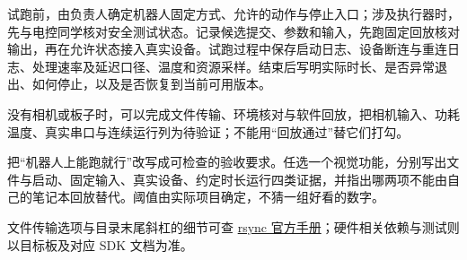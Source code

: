\begin{example}[给一次板端试跑写清证据]
试跑前，由负责人确定机器人固定方式、允许的动作与停止入口；涉及执行器时，先与电控同学核对安全测试状态。记录候选提交、参数和输入，先跑固定回放核对输出，再在允许状态接入真实设备。试跑过程中保存启动日志、设备断连与重连日志、处理速率及延迟口径、温度和资源采样。结束后写明实际时长、是否异常退出、如何停止，以及是否恢复到当前可用版本。

没有相机或板子时，可以完成文件传输、环境核对与软件回放，把相机输入、功耗温度、真实串口与连续运行列为待验证；不能用“回放通过”替它们打勾。
\end{example}

\begin{exercise}\label{ex:deploy-acceptance}
把“机器人上能跑就行”改写成可检查的验收要求。任选一个视觉功能，分别写出文件与启动、固定输入、真实设备、约定时长运行四类证据，并指出哪两项不能由自己的笔记本回放替代。阈值由实际项目确定，不猜一组好看的数字。
\end{exercise}

文件传输选项与目录末尾斜杠的细节可查 \href{https://download.samba.org/pub/rsync/rsync.1}{rsync 官方手册}；硬件相关依赖与测试则以目标板及对应 SDK 文档为准。
